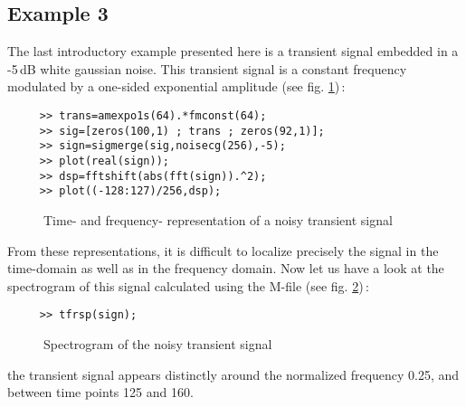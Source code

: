 \subsection{Example 3} 

The last introductory example presented here is a transient signal embedded
in a -5\,dB white gaussian noise. This transient signal is a constant
frequency modulated by a one-sided exponential amplitude (see
fig. \ref{In2fig10})\,: 
\begin{verbatim}
     >> trans=amexpo1s(64).*fmconst(64);
     >> sig=[zeros(100,1) ; trans ; zeros(92,1)];
     >> sign=sigmerge(sig,noisecg(256),-5);
     >> plot(real(sign));
     >> dsp=fftshift(abs(fft(sign)).^2);
     >> plot((-128:127)/256,dsp);
\end{verbatim}
\begin{figure}[htb]
\epsfxsize=10cm
\epsfysize=8cm
\centerline{}
\caption{\label{In2fig10}Time- and frequency- representation of a noisy
transient signal}
\end{figure}
From these representations, it is difficult to localize precisely the
signal in the time-domain as well as in the frequency domain.  Now let us
have a look at the spectrogram of this signal calculated using the M-file
 (see fig. \ref{In2fig11})\,:
\begin{verbatim}
     >> tfrsp(sign);
\end{verbatim}
\begin{figure}[htb]
\epsfxsize=10cm
\epsfysize=8cm
\centerline{}
\caption{\label{In2fig11}Spectrogram of the noisy transient signal}
\end{figure}
the transient signal appears distinctly around the normalized frequency
0.25, and between time points 125 and 160.

